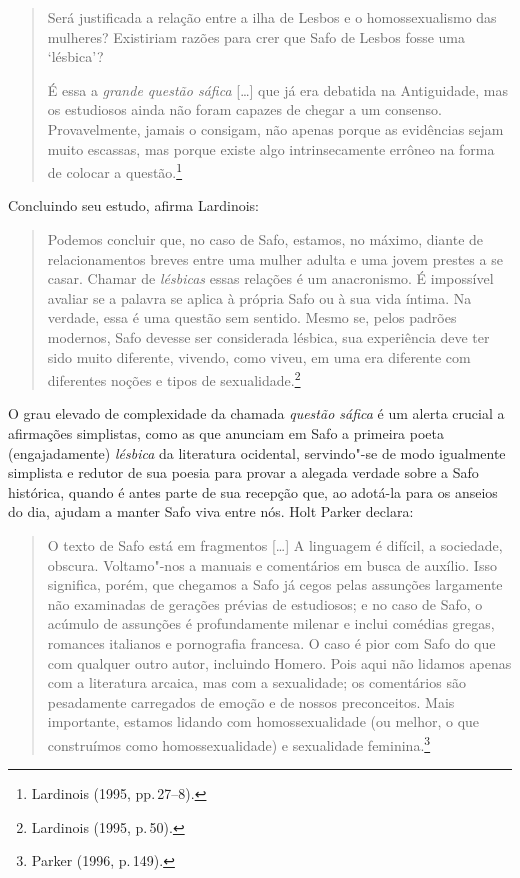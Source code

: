 \begin{quote}
Será justificada a relação entre a ilha de Lesbos e o homossexualismo das
mulheres? Existiriam razões para crer que Safo de Lesbos fosse uma ‘lésbica’?

É essa a \textit{grande questão sáfica} {[}\ldots{}{]} que já era debatida na Antiguidade, mas
os estudiosos ainda não foram capazes de chegar a um consenso. Provavelmente,
jamais o consigam, não apenas porque as evidências sejam muito escassas, mas
porque existe algo intrinsecamente errôneo na forma de colocar a questão.\footnote{ Lardinois (1995, pp.\,27--8).}
\end{quote}

Concluindo seu estudo, afirma Lardinois:

\begin{quote}
Podemos concluir que, no caso de Safo, estamos, no máximo, diante de
relacionamentos breves entre uma mulher adulta e uma jovem prestes a se casar.
Chamar de \textit{lésbicas} essas relações é um anacronismo. É impossível avaliar se a
palavra se aplica à própria Safo ou à sua vida íntima. Na verdade, essa é uma
questão sem sentido. Mesmo se, pelos padrões modernos, Safo devesse ser
considerada lésbica, sua experiência deve ter sido muito diferente, vivendo,
como viveu, em uma era diferente com diferentes noções e tipos de sexualidade.\footnote{ Lardinois (1995, p.\,50).}
\end{quote}

O grau elevado de complexidade da chamada \textit{questão sáfica} é um alerta
crucial a afirmações simplistas, como as que anunciam em Safo a
primeira poeta (engajadamente) \textit{lésbica} da literatura ocidental,
servindo"-se de modo igualmente simplista e redutor de sua poesia para provar a alegada
verdade sobre a Safo histórica, quando é antes parte de sua recepção que, ao adotá-la 
para os anseios do dia, ajudam a manter Safo viva entre nós. Holt Parker declara: 

\begin{quote}
O texto de Safo está em fragmentos {[}\ldots{}{]} A linguagem é difícil, a sociedade,
obscura. Voltamo"-nos a manuais e comentários em busca de auxílio. Isso
significa, porém, que chegamos a Safo já cegos pelas assunções largamente não
examinadas de gerações prévias de estudiosos; e no caso de Safo, o acúmulo de
assunções é profundamente milenar e inclui comédias gregas, romances italianos
e pornografia francesa. O caso é pior com Safo do que com qualquer outro autor,
incluindo Homero. Pois aqui não lidamos apenas com a literatura arcaica, mas
com a sexualidade; os comentários são pesadamente carregados de emoção e de
nossos preconceitos. Mais importante, estamos lidando com homossexualidade (ou
melhor, o que construímos como homossexualidade) e sexualidade feminina.\footnote{ Parker (1996, p.\,149).}
\end{quote}

